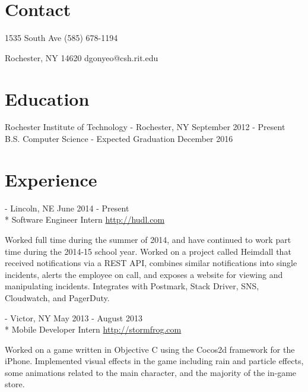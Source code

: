 \documentclass[letterpaper,margin,line,11pt]{resume}
\newcommand{\rurl}[1]{\hfill {\footnotesize \url{#1}}}
\newcommand{\rdate}[1]{\hfill {\small #1}}
\renewcommand{\employer}[5]{\item[#1] - #2 \rdate{#3} \\* #4 \rurl{#5}}
\begin{document}
\begin{resume}
\section{\mysidestyle Contact} 
    \begin{asparablank}
        \item 1535 South Ave \hfill (585) 678-1194
        \item Rochester, NY 14620 \hfill dgonyeo@csh.rit.edu
    \end{asparablank}

\section{\mysidestyle Education}
    \begin{compactdesc}
        \item[Rochester Institute of Technology] - Rochester, NY \rdate{September 2012 - Present}
        \small
        \\B.S. Computer Science  - Expected Graduation December 2016
    \end{compactdesc}

\section{\mysidestyle Experience}
    \begin{asparadesc}
        \employer{Hudl}{Lincoln, NE}{June 2014 - Present}{Software Engineer Intern}{http://hudl.com}

        \small
        Worked full time during the summer of 2014, and have continued to work part time during the 2014-15 school year. Worked on a project called Heimdall that received notifications via a REST API, combines similar notifications into single incidents, alerts the employee on call, and exposes a website for viewing and manipulating incidents. Integrates with Postmark, Stack Driver, SNS, Cloudwatch, and PagerDuty.
        \normalsize
        \\
        \employer{Stormfrog}{Victor, NY}{May 2013 - August 2013}{Mobile Developer Intern}{http://stormfrog.com}

        \small
        Worked on a game written in Objective C using the Cocos2d framework for the iPhone. Implemented visual effects in the game including rain and particle effects, some animations related to the main character, and the majority of the in-game store.
        \normalsize
    \end{asparadesc}


\end{resume}
\end{document}
